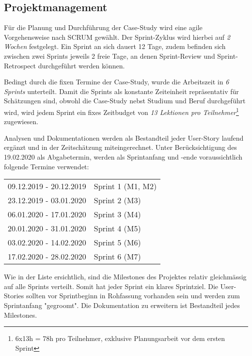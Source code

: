 \subsection{Projektmanagement}
Für die Planung und Durchführung der Case-Study wird eine agile Vorgehensweise nach SCRUM gewählt. Der Sprint-Zyklus wird hierbei auf \emph{2 Wochen} festgelegt. Ein Sprint an sich dauert 12 Tage, zudem befinden sich zwischen zwei Sprints jeweils 2 freie Tage, an denen Sprint-Review und Sprint-Retrospect durchgeführt werden können.

Bedingt durch die fixen Termine der Case-Study, wurde die Arbeitszeit in \emph{6 Sprints} unterteilt. Damit die Sprints als konstante Zeiteinheit repräsentativ für Schätzungen sind, obwohl die Case-Study nebst Studium und Beruf durchgeführt wird, wird jedem Sprint ein fixes Zeitbudget von \emph{13 Lektionen pro Teilnehmer}\footnote{6x13h = 78h pro Teilnehmer, exklusive Planungsarbeit vor dem ersten Sprint} zugewiesen.

Analysen und Dokumentationen werden als Bestandteil jeder User-Story laufend ergänzt und in der Zeitschätzung miteingerechnet. Unter Berücksichtigung des 19.02.2020 als Abgabetermin, werden als Sprintanfang und -ende voraussichtlich folgende Termine verwendet:

\begin{center}
  \begin{tabular}{ l l } 
    09.12.2019 - 20.12.2019 & Sprint 1 (M1, M2) \\ 
    23.12.2019 - 03.01.2020 & Sprint 2 (M3) \\ 
    06.01.2020 - 17.01.2020 & Sprint 3 (M4) \\ 
    20.01.2020 - 31.01.2020 & Sprint 4 (M5) \\
    03.02.2020 - 14.02.2020 & Sprint 5 (M6) \\
    17.02.2020 - 28.02.2020 & Sprint 6 (M7) \\ 
  \end{tabular}
\end{center}

\noindent
Wie in der Liste ersichtlich, sind die Milestones des Projektes relativ gleichmässig auf alle Sprints verteilt. Somit hat jeder Sprint ein klares Sprintziel. Die User-Stories sollten vor Sprintbeginn in Rohfassung vorhanden sein und werden zum Sprintanfang "gegroomt". Die Dokumentation zu erweitern ist Bestandteil jedes Milestones.
